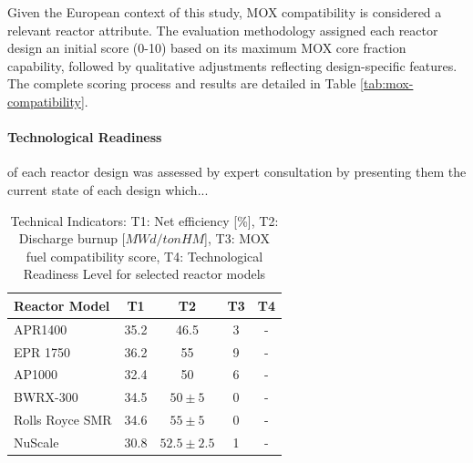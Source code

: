 Given the European context of this study, MOX compatibility is considered a relevant reactor attribute. The evaluation methodology assigned each reactor design an initial score (0-10) based on its maximum MOX core fraction capability, followed by qualitative adjustments reflecting design-specific features. The complete scoring process and results are detailed in Table \ref{tab:mox-compatibility}.


\paragraph{Technological Readiness} of each reactor design was assessed by expert consultation by presenting them the current state of each design which...

\begin{table}[!ht]
    \centering
    \begin{tabularx}{\textwidth}{X c c c c}
        \toprule
        \textbf{Reactor Model} & \textbf{T1} & \textbf{T2} & \textbf{T3} & \textbf{T4}\\
        \midrule
        APR1400         & 35.2 & 46.5 & 3 & - \\
        EPR 1750        & 36.2 & 55 & 9 & -\\
        AP1000          & 32.4 & 50 & 6 & - \\
        BWRX-300        & 34.5 & $50 \pm 5$ & 0 & - \\
        Rolls Royce SMR & 34.6 & $55 \pm 5$ & 0 & - \\
        NuScale         & 30.8 & $52.5 \pm 2.5$ & 1 & - \\
        \bottomrule
    \end{tabularx}
    \caption{Technical Indicators: T1: Net efficiency [\%], T2: Discharge burnup [$MWd/tonHM$], T3: MOX fuel compatibility score, T4: Technological Readiness Level for selected reactor models}
    \label{tab:indicators-technical}
\end{table}



